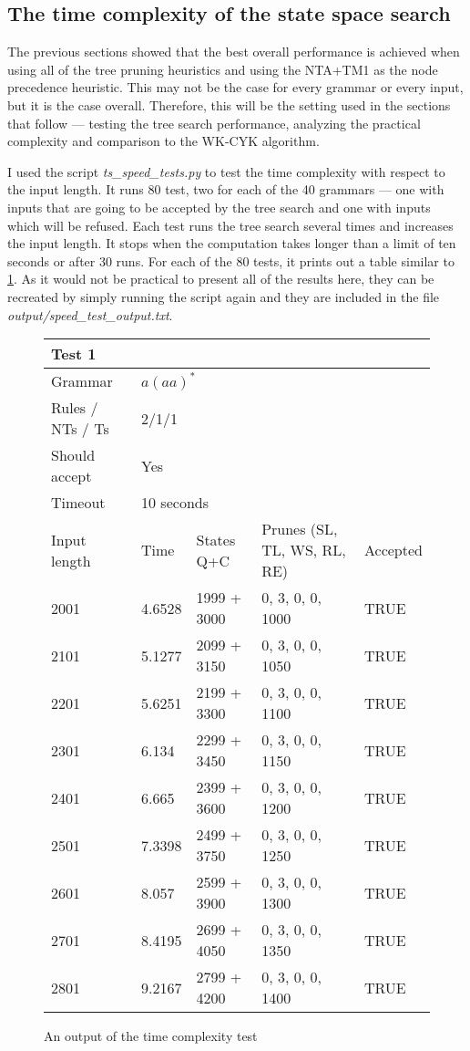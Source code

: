 \subsection{The time complexity of the state space search}
The previous sections showed that the best overall performance is achieved when using all of the tree pruning heuristics and using the NTA+TM1 as the node precedence heuristic. This may not be the case for every grammar or every input, but it is the case overall. Therefore, this will be the setting used in the sections that follow --- testing the tree search performance, analyzing the practical complexity and comparison to the WK-CYK algorithm.

I used the script \textit{ts\_speed\_tests.py} to test the time complexity with respect to the input length. It runs 80 test, two for each of the 40 grammars --- one with inputs that are going to be accepted by the tree search and one with inputs which will be refused. Each test runs the tree search several times and increases the input length. It stops when the computation takes longer than a limit of ten seconds or after 30 runs. For each of the 80 tests, it prints out a table similar to \ref{tab:input_compl_test}. As it would not be practical to present all of the results here, they can be recreated by simply running the script again and they are included in the file \textit{output/speed\_test\_output.txt}.

\begin{figure}[h!]
  \caption{An output of the time complexity test}
  \label{tab:input_compl_test}
\begin{tabular}{ |l|l|l|l|l|  }
  \hline
  \multicolumn{5}{|l|}{Test 1} \\
  \hline
  Grammar & \multicolumn{4}{|l|}{$a(aa)^*$} \\
  Rules / NTs / Ts & \multicolumn{4}{|l|}{2/1/1} \\
  Should accept & \multicolumn{4}{|l|}{Yes} \\
  Timeout & \multicolumn{4}{|l|}{10 seconds} \\
  \hline
  Input length & Time & States Q+C & Prunes (SL, TL, WS, RL, RE)& Accepted \\
  \hline
 2001 & 4.6528 & 1999 + 3000 & 0, 3, 0, 0, 1000 & TRUE \\
 2101 & 5.1277 & 2099 + 3150 & 0, 3, 0, 0, 1050 & TRUE \\
 2201 & 5.6251 &2199 + 3300 & 0, 3, 0, 0, 1100 & TRUE \\
 2301 & 6.134 & 2299 + 3450 & 0, 3, 0, 0, 1150 & TRUE \\
 2401 & 6.665 & 2399 + 3600 & 0, 3, 0, 0, 1200 & TRUE \\
 2501 & 7.3398 & 2499 + 3750 & 0, 3, 0, 0, 1250 & TRUE \\
 2601 & 8.057 & 2599 + 3900 & 0, 3, 0, 0, 1300 & TRUE \\
 2701 & 8.4195 & 2699 + 4050 & 0, 3, 0, 0, 1350 & TRUE \\
 2801 & 9.2167 & 2799 + 4200 & 0, 3, 0, 0, 1400 & TRUE \\
  \hline
\end{tabular}
\end{figure}

